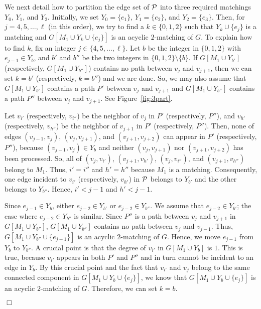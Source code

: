 \documentclass[11pt,twoside]{article}\usepackage{amssymb,latexsym,graphicx,hyperref}\usepackage{epstopdf}
\newenvironment{proof}{{\sc Proof. }}{\hfill$\Box$\vspace{0.2in}}
\begin{document}
\begin{proof}
We next detail how to partition the edge set of ${\cal P}$ into three required matchings $Y_0$, $Y_1$, and $Y_2$.
Initially, we set $Y_0 = \{e_1\}$, $Y_1 = \{e_2\}$, and $Y_2 = \{e_3\}$.
Then, for $j = 4, 5, \ldots, \ell$ (in this order), we try to find a $k \in \{0,1,2\}$ such that
$Y_k \cup\{e_j\}$ is a matching and $G[M_1 \cup Y_k \cup\{e_j\}]$ is an acyclic $2$-matching of $G$. 
To explain how to find $k$, fix an integer $j \in \{4, 5, \ldots, \ell\}$. 
Let $b$ be the integer in $\{0,1,2\}$ with $e_{j-1} \in Y_b$, and $b'$ and $b''$ be the two integers in $\{0,1,2\} \setminus \{b\}$. 
If $G[M_1 \cup Y_{b'}]$ (respectively, $G[M_1 \cup Y_{b''}]$) contains no path between $v_j$ and $v_{j+1}$,
then we can set $k = b'$ (respectively, $k = b''$) and we are done.
So, we may also assume that $G[M_1 \cup Y_{b'}]$ contains a path $P'$ between $v_j$ and $v_{j+1}$ and
$G[M_1 \cup Y_{b''}]$ contains a path $P''$ between $v_j$ and $v_{j+1}$.
See Figure~\ref{fig:3part}. 

Let $v_{i'}$ (respectively, $v_{i''}$) be the neighbor of $v_j$ in $P'$ (respectively, $P''$),
and $v_{h'}$ (respectively, $v_{h''}$) be the neighbor of $v_{j+1}$ in $P'$ (respectively, $P''$).
Then, none of edges $(v_{j-1}, v_j)$, $(v_j, v_{j+1})$, and $(v_{j+1}, v_{j+2})$ can appear in $P'$ (respectively, $P''$),
because $(v_{j-1}, v_j)\in Y_b$ and neither $(v_j, v_{j+1})$ nor $(v_{j+1}, v_{j+2})$ has been processed.
So, all of $(v_j, v_{i'})$, $(v_{j+1}, v_{h'})$, $(v_j, v_{i''})$, and $(v_{j+1}, v_{h''})$ belong to $M_1$.
Thus, $i' = i''$ and $h' = h''$ because $M_1$ is a matching.
Consequently, one edge incident to $v_{i'}$ (respectively, $v_{h'}$) in ${\cal P}$ belongs to $Y_{b'}$ and the other belongs to $Y_{b''}$.
Hence, $i' < j - 1$ and $h' < j - 1$. 

Since $e_{j-1} \in Y_b$, either $e_{j-2} \in Y_{b'}$ or $e_{j-2} \in Y_{b''}$. 
We assume that $e_{j-2} \in Y_{b'}$; the case where $e_{j-2} \in Y_{b''}$ is similar. 
Since $P''$ is a path between $v_j$ and $v_{j+1}$ in $G[M_1 \cup Y_{b''}]$, $G[M_1 \cup Y_{b''}]$ contains no path between $v_j$ and $v_{j-1}$.
Thus, $G[M_1 \cup Y_{b''}\cup\{e_{j-1}\}]$ is an acyclic $2$-matching of $G$.
Hence, we move $e_{j-1}$ from $Y_{b}$ to $Y_{b''}$. 
A crucial point is that the degree of $v_{i'}$ in $G[M_1 \cup Y_b]$ is $1$. 
This is true, because $v_{i'}$ appears in both $P'$ and $P''$ and in turn cannot be incident to an edge in $Y_{b}$.
By this crucial point and the fact that $v_{i'}$ and $v_j$ belong to the same connected component in $G[M_1 \cup Y_{b}\cup\{e_{j}\}]$,
we know that $G[M_1 \cup Y_{b}\cup\{e_{j}\}]$ is an acyclic $2$-matching of $G$.
Therefore, we can set $k = b$. 



\end{proof}
\end{document}

